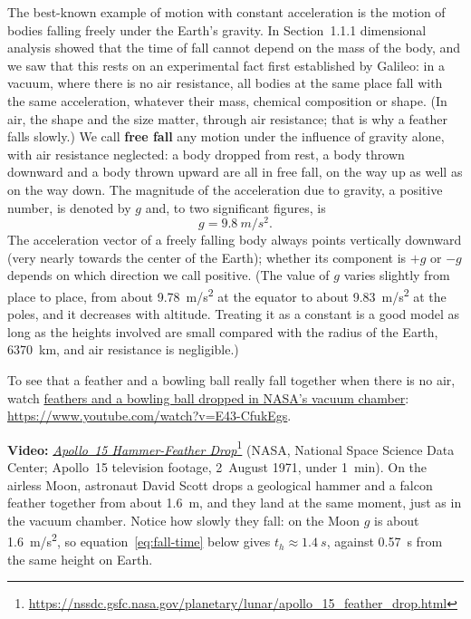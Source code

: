 \documentclass[11pt,a4paper]{article}
\begin{document}
The best-known example of motion with constant acceleration is the motion of bodies falling
freely under the Earth's gravity. In Section~1.1.1 dimensional analysis showed that the time of
fall cannot depend on the mass of the body, and we saw that this rests on an experimental fact
first established by Galileo: in a vacuum, where there is no air resistance, all bodies at the
same place fall with the same acceleration, whatever their mass, chemical composition or shape. (In
air, the shape and the size matter, through air resistance; that is why a feather falls slowly.)
We call \textbf{free fall} any motion under the influence of gravity alone, with air resistance
neglected: a body dropped from rest, a body thrown downward and a body thrown upward are all in
free fall, on the way up as well as on the way down. The magnitude of the acceleration due to
gravity, a positive number, is denoted by $g$ and, to two significant figures, is
\begin{equation}\label{eq:g}
  g = \qty{9.8}{m/s^2} .
\end{equation}
The acceleration vector of a freely falling body always points vertically downward (very nearly
towards the center of the Earth); whether its component is $+g$ or $-g$ depends on which direction we call positive. (The
value of $g$ varies slightly from place to place, from about \qty{9.78}{m/s^2} at the equator to
about \qty{9.83}{m/s^2} at the poles, and it decreases with altitude. Treating it as a constant is a
good model as long as the heights involved are small compared with the radius of the Earth,
\qty{6370}{km}, and air resistance is negligible.)

\begin{aside}
To see that a feather and a bowling ball really fall together when there is no air, watch
\href{https://www.youtube.com/watch?v=E43-CfukEgs}{feathers and a bowling ball dropped in NASA's
vacuum chamber}: \url{https://www.youtube.com/watch?v=E43-CfukEgs}.
\par\smallskip
\textbf{Video:}
\href{https://nssdc.gsfc.nasa.gov/planetary/lunar/apollo_15_feather_drop.html}{\emph{Apollo~15
Hammer-Feather Drop}}\footnote{\url{https://nssdc.gsfc.nasa.gov/planetary/lunar/apollo_15_feather_drop.html}}
(NASA, National Space Science Data Center; Apollo~15 television footage, 2~August 1971, under
1~min). On the airless Moon, astronaut David Scott drops a geological hammer and a falcon feather
together from about \qty{1.6}{m}, and they land at the same moment, just as in the vacuum chamber.
Notice how slowly they fall: on the Moon $g$ is about \qty{1.6}{m/s^2}, so
equation~\eqref{eq:fall-time} below gives $t_h \approx \qty{1.4}{s}$, against \qty{0.57}{s} from
the same height on Earth.
\end{aside}
\end{document}
